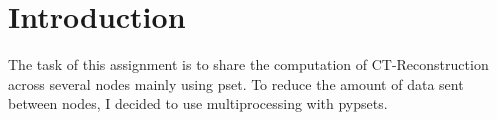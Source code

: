 \documentclass{Article}
\begin{document}

\clearpage\maketitle
\thispagestyle{empty}

\newpage



%

\section{Introduction}
The task of this assignment is to share the computation of CT-Reconstruction across several nodes mainly using pset. To reduce the amount of data sent between nodes, I decided to use multiprocessing with pypsets. 
\end{document}
